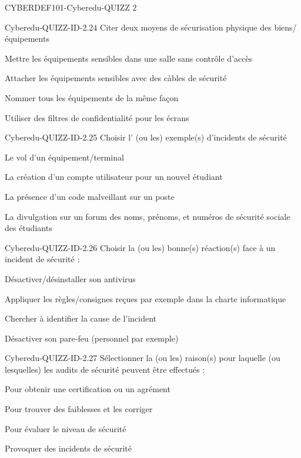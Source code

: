 \documentclass[12pt]{article}
\begin{document}
\begin{quiz}{CYBERDEF101-Cyberedu-QUIZZ 2}
\begin{multi}[multiple=true]{Cyberedu-QUIZZ-ID-2.24}
	Citer deux moyens de s\'ecurisation physique des biens/\'equipements
\item Mettre les \'equipements sensibles dans une salle sans contr\^ole d'acc\`es
\item* Attacher les \'equipements sensibles avec des c\`{a}bles de s\'ecurit\'e
\item Nommer tous les \'equipements de la m\^eme fa\c{c}on
\item* Utiliser des filtres de confidentialit\'e pour les \'ecrans
\end{multi}

\begin{multi}[multiple=true]{Cyberedu-QUIZZ-ID-2.25}
	Choisir l' (ou les) exemple(s) d'incidents de s\'ecurit\'e
\item* Le vol d'un \'equipement/terminal
\item La cr\'eation d'un compte utilisateur pour un nouvel \'etudiant
\item* La pr\'esence d'un code malveillant sur un poste
\item* La divulgation sur un forum des noms, pr\'enoms, et num\'eros de s\'ecurit\'e sociale des \'etudiants
\end{multi}

\begin{multi}[multiple=true]{Cyberedu-QUIZZ-ID-2.26}
	Choisir la (ou les) bonne(s) r\'eaction(s) face \`{a} un incident de s\'ecurit\'e :
\item D\'esactiver/d\'esinstaller son antivirus
\item* Appliquer les r\`egles/consignes re\c{c}ues par exemple dans la charte informatique
\item* Chercher \`{a} identifier la cause de l'incident
\item D\'esactiver son pare-feu (personnel par exemple)
\end{multi}

\begin{multi}[multiple=true]{Cyberedu-QUIZZ-ID-2.27}
	S\'electionner la (ou les) raison(s) pour laquelle (ou lesquelles) les audits de s\'ecurit\'e peuvent \^etre effectu\'es :
\item* Pour obtenir une certification ou un agr\'ement
\item* Pour trouver des faiblesses et les corriger
\item* Pour \'evaluer le niveau de s\'ecurit\'e
\item Provoquer des incidents de s\'ecurit\'e
\end{multi}

  \end{quiz}
   
\end{document}
